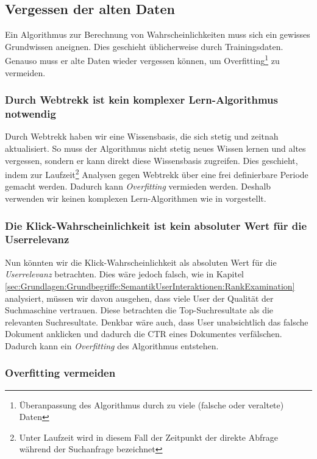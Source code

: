 \subsection{Vergessen der alten Daten}
\label{sec:Reranking:Methodik:Vergessen}

Ein Algorithmus zur Berechnung von Wahrscheinlichkeiten muss sich ein gewisses Grundwissen aneignen. Dies geschieht üblicherweise durch Trainingsdaten. Genauso muss er alte Daten wieder vergessen können, um Overfitting\footnote{Überanpassung des Algorithmus durch zu viele (falsche oder veraltete) Daten} zu vermeiden. 

\subsubsection{Durch Webtrekk ist kein komplexer Lern-Algorithmus notwendig}
\label{sec:Reranking:Methodik:Vergessen:Lern-Algorithmus}

Durch Webtrekk haben wir eine Wissensbasis, die sich stetig und zeitnah aktualisiert. So muss der Algorithmus nicht stetig neues Wissen lernen und altes vergessen, sondern er kann direkt diese Wissensbasis zugreifen. Dies geschieht, indem zur Laufzeit\footnote{Unter Laufzeit wird in diesem Fall der Zeitpunkt der direkte Abfrage während der Suchanfrage bezeichnet} Analysen gegen Webtrekk über eine frei definierbare Periode gemacht werden. Dadurch kann \textit{Overfitting} vermieden werden. Deshalb verwenden wir keinen komplexen Lern-Algorithmen wie in \cite{IWUSBI} vorgestellt.

\subsubsection{Die Klick-Wahrscheinlichkeit ist kein absoluter Wert für die Userrelevanz}
\label{sec:Reranking:Methodik:Vergessen:Relevanzfeedback}

Nun könnten wir die Klick-Wahrscheinlichkeit als absoluten Wert für die \textit{Userrelevanz} betrachten. Dies wäre jedoch falsch, wie in Kapitel \ref{sec:Grundlagen:Grundbegriffe:SemantikUserInteraktionen:RankExamination} analysiert, müssen wir davon ausgehen, dass viele User der Qualität der Suchmaschine vertrauen. Diese betrachten die \glqq Top-Suchresultate\grqq{} als die relevanten Suchresultate. Denkbar wäre auch, dass User unabsichtlich das falsche Dokument anklicken und dadurch die CTR eines Dokumentes verfälschen. Dadurch kann ein \textit{Overfitting} des Algorithmus entstehen.

\subsubsection{Overfitting vermeiden}
\label{sec:Reranking:Methodik:Vergessen:Overfitting}

